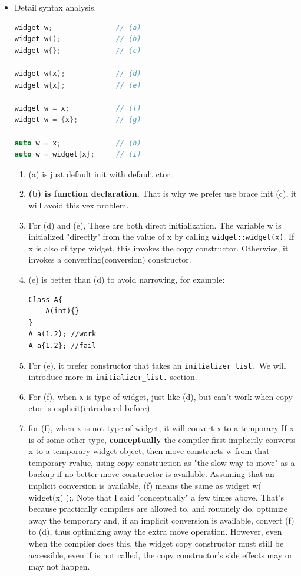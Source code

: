 \documentclass[a4paper,11pt,twoside]{book}
\begin{document}
\begin{itemize}
	
\item Detail syntax analysis.
\begin{lstlisting}[frame=single, language=c++,mathescape=true]
widget w;               // (a)
widget w();             // (b)
widget w{};             // (c)
	
widget w(x);            // (d)
widget w{x};            // (e)
	
widget w = x;           // (f)
widget w = {x};         // (g)
	
auto w = x;             // (h)
auto w = widget{x};     // (i)
\end{lstlisting}
	
	\begin{enumerate}
		\item (a) is just default init with default ctor.
		
		\item \textbf{(b) is function declaration.} That is why we prefer use brace init (c), it will avoid this vex problem.
		
		\item For (d) and (e), These are both direct initialization. The variable w is initialized "directly" from the value of x by calling \texttt{widget::widget(x)}. If x is also of type widget, this invokes the copy constructor. Otherwise, it invokes a converting(conversion) constructor.
		
		\item (e) is better than (d) to avoid narrowing, for example:
\begin{lstlisting}[numbers=none]
Class A{
	A(int){}
}
A a(1.2); //work
A a{1.2}; //fail
\end{lstlisting}
		\item For (e), it prefer constructor that takes an \texttt{initializer\_list.} We will introduce more in \texttt{initializer\_list.} section.
		
		\item For (f), when \texttt{x} is type of widget, just like (d), but can't work when copy ctor is explicit(introduced before)
		
		\item for (f), when x is not type of widget, it will convert x to a temporary If x is of some other type, \textbf{conceptually} the compiler first implicitly converts x to a temporary widget object, then move-constructs w from that temporary rvalue, using copy construction as "the slow way to move" as a backup if no better move constructor is available. Assuming that an implicit conversion is available, (f) means the same as widget w( widget(x) );. Note that I said "conceptually" a few times above. That's because practically compilers are allowed to, and routinely do, optimize away the temporary and, if an implicit conversion is available, convert (f) to (d), thus optimizing away the extra move operation. However, even when the compiler does this, the widget copy constructor must still be accessible, even if is not called, the copy constructor's side effects may or may not happen.


\end{enumerate}
\end{itemize}
\end{document}
